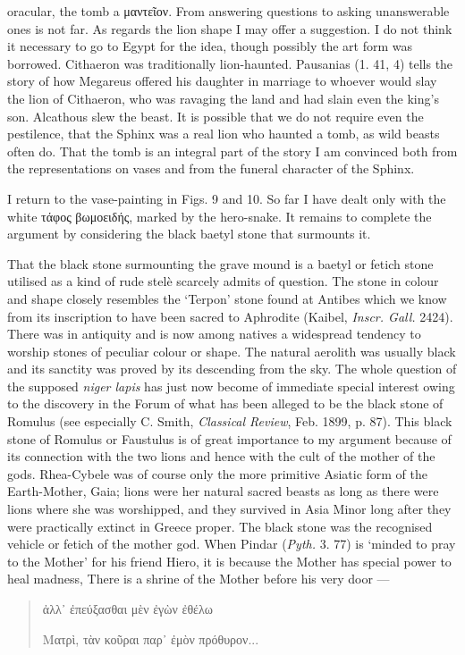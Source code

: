 \documentclass[a4paper, 11pt, oneside, polutonikogreek, english]{article}
\begin{document}
oracular, the tomb a μαντεῖον. From answering questions to asking unanswerable ones is not far. As regards the lion shape I may offer a suggestion. I do not think it necessary to go to Egypt for the idea, though possibly the art form was borrowed. Cithaeron was traditionally lion-haunted. Pausanias (1. 41, 4) tells the story of how Megareus offered his daughter in marriage to whoever would slay the lion of Cithaeron, who was ravaging the land and had slain even the king's son. Alcathous slew the beast. It is possible that we do not require even the pestilence, that the Sphinx was a real lion who haunted a tomb, as wild beasts often do. That the tomb is an integral part of the story I am convinced both from the representations on vases and from the funeral character of the Sphinx.

I return to the vase-painting in Figs. 9 and 10. So far I have dealt only with the white τάφος βωμοειδής, marked by the hero-snake. It remains to complete the argument by considering the black baetyl stone that surmounts it.

That the black stone surmounting the grave mound is a baetyl or fetich stone utilised as a kind of rude stelè scarcely admits of question. The stone in colour and shape closely resembles the `Terpon' stone found at Antibes which we know from its inscription to have been sacred to Aphrodite (Kaibel, \emph{Inscr. Gall.} 2424). There was in antiquity and is now among natives a widespread tendency to worship stones of peculiar colour or shape. The natural aerolith was usually black and its sanctity was proved by its descending from the sky. The whole question of the supposed \emph{niger lapis} has just now become of immediate special interest owing to the discovery in the Forum of what has been alleged to be the black stone of Romulus (see especially C. Smith, \emph{Classical Review}, Feb. 1899, p. 87). This black stone of Romulus or Faustulus is of great importance to my argument because of its connection with the two lions and hence with the cult of the mother of the gods. Rhea-Cybele was of course only the more primitive Asiatic form of the Earth-Mother, Gaia; lions were her natural sacred beasts as long as there were lions where she was worshipped, and they survived in Asia Minor long after they were practically extinct in Greece proper. The black stone was the recognised vehicle or fetich of the mother god. When Pindar (\emph{Pyth.} 3. 77) is `minded to pray to the Mother' for his friend Hiero, it is because the Mother has special power to heal madness, There is a shrine of the Mother before his very door ---
\begin{quotation}
ἀλλ᾽ ἐπεύξασθαι μὲν ἐγὼν ἐθέλω

Ματρὶ, τὰν κοῦραι παρ᾽ ἐμὸν πρόθυρον...
\end{quotation}
\end{document}
